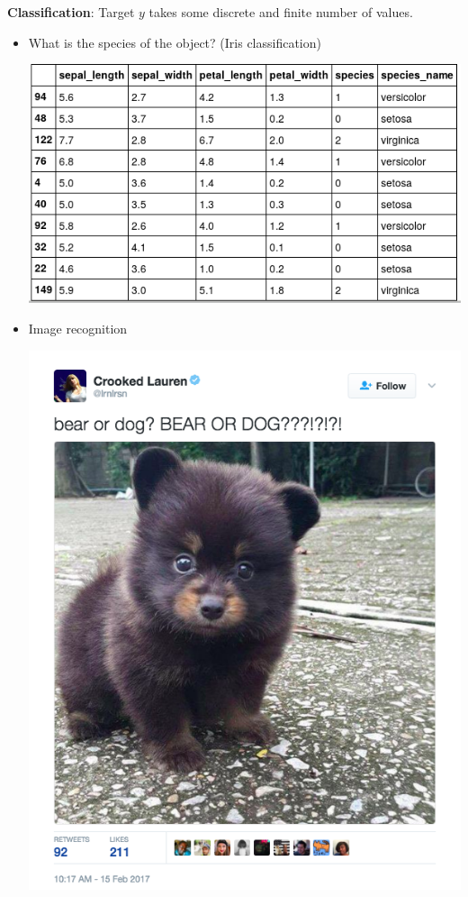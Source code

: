 \documentclass[12pt,t]{beamer}
\begin{document}
\begin{frame}

{\bf Classification}: Target $y$ takes some discrete and finite number of values.

\begin{itemize}
\item What is the species of the object? (Iris classification)
\centerline{
\includegraphics[height=0.5\textheight]{./images/iris.png}
}  
\end{itemize}

\end{frame}

\begin{frame}
\begin{itemize}
\item Image recognition
\centerline{
\includegraphics[height=0.8\textheight]{./images/dogorbear.png}
} 
\end{itemize}

\end{frame}
\end{document}

